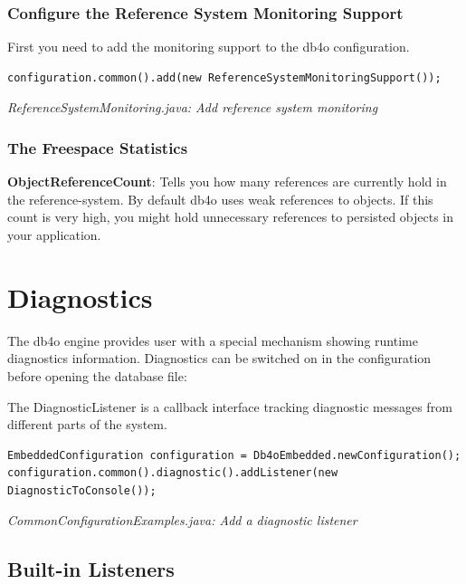\subsubsection*{Configure the Reference System Monitoring Support}

First you need to add the monitoring support to the db4o configuration.

\begin{lstlisting}
configuration.common().add(new ReferenceSystemMonitoringSupport());
\end{lstlisting}

{\small\itshape ReferenceSystemMonitoring.java: Add reference system monitoring\par}
\medskip

\subsubsection*{The Freespace Statistics}

\textbf{ObjectReferenceCount}: Tells you how many references are currently hold in the reference-system. By default db4o uses weak references to objects. If this count is very high, you might hold unnecessary references to persisted objects in your application.

\section{Diagnostics}
\label{ref:advanced-topics-diagnostics}

The db4o engine provides user with a special mechanism showing runtime diagnostics information. Diagnostics can be switched on in the configuration before opening the database file:

The DiagnosticListener is a callback interface tracking diagnostic messages from different parts of the system.

\begin{lstlisting}
EmbeddedConfiguration configuration = Db4oEmbedded.newConfiguration();
configuration.common().diagnostic().addListener(new DiagnosticToConsole());
\end{lstlisting}

{\small\itshape CommonConfigurationExamples.java: Add a diagnostic listener\par}
\medskip

\subsection*{Built-in Listeners}


